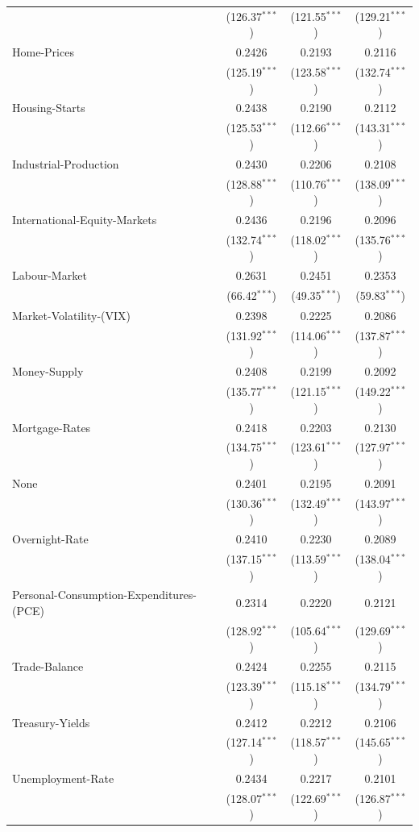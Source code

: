 \begin{tabular}{lccc}
 & (126.37$^{***}$) & (121.55$^{***}$) & (129.21$^{***}$) \\
Home-Prices & 0.2426 & 0.2193 & 0.2116 \\
 & (125.19$^{***}$) & (123.58$^{***}$) & (132.74$^{***}$) \\
Housing-Starts & 0.2438 & 0.2190 & 0.2112 \\
 & (125.53$^{***}$) & (112.66$^{***}$) & (143.31$^{***}$) \\
Industrial-Production & 0.2430 & 0.2206 & 0.2108 \\
 & (128.88$^{***}$) & (110.76$^{***}$) & (138.09$^{***}$) \\
International-Equity-Markets & 0.2436 & 0.2196 & 0.2096 \\
 & (132.74$^{***}$) & (118.02$^{***}$) & (135.76$^{***}$) \\
Labour-Market & 0.2631 & 0.2451 & 0.2353 \\
 & (66.42$^{***}$) & (49.35$^{***}$) & (59.83$^{***}$) \\
Market-Volatility-(VIX) & 0.2398 & 0.2225 & 0.2086 \\
 & (131.92$^{***}$) & (114.06$^{***}$) & (137.87$^{***}$) \\
Money-Supply & 0.2408 & 0.2199 & 0.2092 \\
 & (135.77$^{***}$) & (121.15$^{***}$) & (149.22$^{***}$) \\
Mortgage-Rates & 0.2418 & 0.2203 & 0.2130 \\
 & (134.75$^{***}$) & (123.61$^{***}$) & (127.97$^{***}$) \\
None & 0.2401 & 0.2195 & 0.2091 \\
 & (130.36$^{***}$) & (132.49$^{***}$) & (143.97$^{***}$) \\
Overnight-Rate & 0.2410 & 0.2230 & 0.2089 \\
 & (137.15$^{***}$) & (113.59$^{***}$) & (138.04$^{***}$) \\
Personal-Consumption-Expenditures-(PCE) & 0.2314 & 0.2220 & 0.2121 \\
 & (128.92$^{***}$) & (105.64$^{***}$) & (129.69$^{***}$) \\
Trade-Balance & 0.2424 & 0.2255 & 0.2115 \\
 & (123.39$^{***}$) & (115.18$^{***}$) & (134.79$^{***}$) \\
Treasury-Yields & 0.2412 & 0.2212 & 0.2106 \\
 & (127.14$^{***}$) & (118.57$^{***}$) & (145.65$^{***}$) \\
Unemployment-Rate & 0.2434 & 0.2217 & 0.2101 \\
 & (128.07$^{***}$) & (122.69$^{***}$) & (126.87$^{***}$) \\
\hline
\end{tabular}